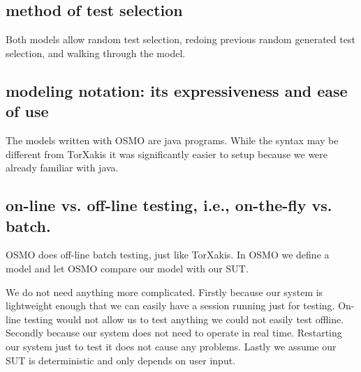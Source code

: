 \documentclass[11pt,a4paper]{article}
\begin{document}
\subsection{method of test selection}
Both models allow random test selection, redoing previous random
generated test selection, and walking through the model.
\subsection{modeling notation: its expressiveness and ease of use}

The models written with OSMO are java programs. While the syntax may
be different from TorXakis it was significantly easier to setup
because we were already familiar with java.

\subsection{on-line vs. off-line testing, i.e., on-the-fly vs. batch.}

OSMO does off-line batch testing, just like TorXakis. In OSMO we
define a model and let OSMO compare our model with our SUT.

We do not need anything more complicated. Firstly because our system
is lightweight enough that we can easily have a session running just
for testing. On-line testing would not allow us to test anything we
could not easily test offline. Secondly because our system does not
need to operate in real time. Restarting our system just to test it
does not cause any problems. Lastly we assume our SUT is deterministic
and only depends on user input.


\end{document}

